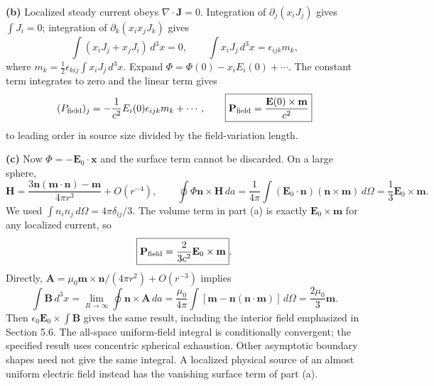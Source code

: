 \textbf{(b)} Localized steady current obeys $\nabla\cdot\mathbf J=0$.
Integration of $\partial_j(x_iJ_j)$ gives $\int J_i=0$; integration of
$\partial_k(x_ix_jJ_k)$ gives
\[
\int(x_iJ_j+x_jJ_i)\,d^3x=0,\qquad
\int x_iJ_j\,d^3x=\epsilon_{ijk}m_k,
\]
where $m_k=\tfrac12\epsilon_{kij}\int x_iJ_j\,d^3x$.
Expand $\Phi=\Phi(0)-x_iE_i(0)+\cdots$. The constant term integrates to
zero and the linear term gives
\[
(P_{\rm field})_j=-\frac1{c^2}E_i(0)\epsilon_{ijk}m_k+\cdots,
\qquad
\boxed{\mathbf P_{\rm field}=\frac{\mathbf E(0)\times\mathbf m}{c^2}}
\]
to leading order in source size divided by the field-variation length.

\textbf{(c)} Now $\Phi=-\mathbf E_0\cdot\mathbf x$ and the surface term
cannot be discarded. On a large sphere,
\[
\mathbf H=\frac{3\mathbf n(\mathbf m\cdot\mathbf n)-\mathbf m}{4\pi r^3}
+O(r^{-4}),\qquad
\oint\Phi\mathbf n\times\mathbf H\,da
=\frac1{4\pi}\int(\mathbf E_0\cdot\mathbf n)(\mathbf n\times\mathbf m)\,d\Omega
=\frac13\mathbf E_0\times\mathbf m.
\]
We used $\int n_in_j\,d\Omega=4\pi\delta_{ij}/3$. The volume term in
part (a) is exactly $\mathbf E_0\times\mathbf m$ for any localized current,
so
\[
\boxed{\mathbf P_{\rm field}=\frac{2}{3c^2}\mathbf E_0\times\mathbf m}.
\]
Directly, $\mathbf A=\mu_0\mathbf m\times\mathbf n/(4\pi r^2)+O(r^{-3})$
implies
\[
\int\mathbf B\,d^3x=\lim_{R\to\infty}\oint\mathbf n\times\mathbf A\,da
=\frac{\mu_0}{4\pi}\int[\mathbf m-\mathbf n(\mathbf n\cdot\mathbf m)]\,d\Omega
=\frac{2\mu_0}{3}\mathbf m.
\]
Then $\epsilon_0\mathbf E_0\times\int\mathbf B$ gives the same result,
including the interior field emphasized in Section 5.6. The all-space
uniform-field integral is conditionally convergent; the specified result
uses concentric spherical exhaustion. Other asymptotic boundary shapes
need not give the same integral. A localized physical source of an almost
uniform electric field instead has the vanishing surface term of part (a).

